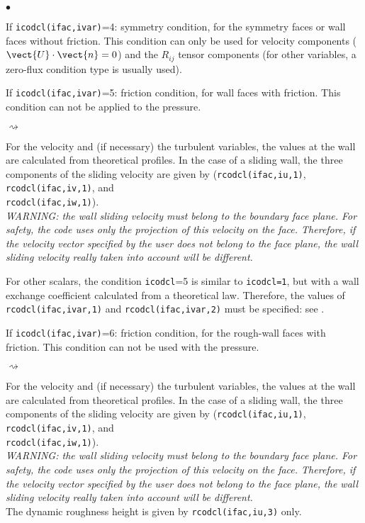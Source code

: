 {{{\begin{list}{$\bullet$}{}
\item If \texttt{icodcl(ifac,ivar)}=4: symmetry condition, for the symmetry
      faces or wall faces without friction. This condition can only be
      used for velocity components ($\vect{U}\cdot\vect{n}=0$) and
      the $R_{ij}$ tensor components (for other variables, a zero-flux
      condition type is usually used).\\

\item If \texttt{icodcl(ifac,ivar)}=5: friction condition, for wall faces
      with friction. This condition can not be applied to the pressure.
\begin{list}{$\rightsquigarrow$}{}
\item For the velocity and (if necessary) the turbulent variables, the
      values at the wall are calculated from theoretical profiles. In
      the case of a sliding wall, the three components of the sliding
      velocity are given by (\texttt{rcodcl(ifac,iu,1)},
      \texttt{rcodcl(ifac,iv,1)}, and \\\texttt{rcodcl(ifac,iw,1)}).\\
{\em WARNING: the wall sliding velocity must belong to the boundary face
      plane. For safety, the code uses only the projection of this
      velocity on the face. Therefore, if the velocity vector specified
      by the user does not belong to the face plane, the wall sliding velocity really
      taken into account will be different.}

\item For other scalars, the condition \texttt{icodcl}=5 is similar to
      \texttt{icodcl=1}, but with a wall exchange coefficient calculated from a
      theoretical law. Therefore, the values of \\\texttt{rcodcl(ifac,ivar,1)} and
      \texttt{rcodcl(ifac,ivar,2)} must be specified: see \cite{theory}.
\end{list}

\item If \texttt{icodcl(ifac,ivar)}=6: friction condition, for the rough-wall faces
      with friction. This condition can not be used with the pressure.
\begin{list}{$\rightsquigarrow$}{}
\item For the velocity and (if necessary) the turbulent variables, the
      values at the wall are calculated from theoretical profiles. In
      the case of a sliding wall, the three components of the sliding
      velocity are given by (\texttt{rcodcl(ifac,iu,1)},
      \texttt{rcodcl(ifac,iv,1)}, and \\\texttt{rcodcl(ifac,iw,1)}).\\
      {\em WARNING: the wall sliding velocity must belong to the boundary face
      plane. For safety, the code uses only the projection of this
      velocity on the face. Therefore, if the velocity vector specified
      by the user does not belong to the face plane, the wall sliding velocity really
      taken into account will be different.}\\
      The dynamic roughness height is given by \texttt{rcodcl(ifac,iu,3)} only.


\end{list}
\end{list}}}}
